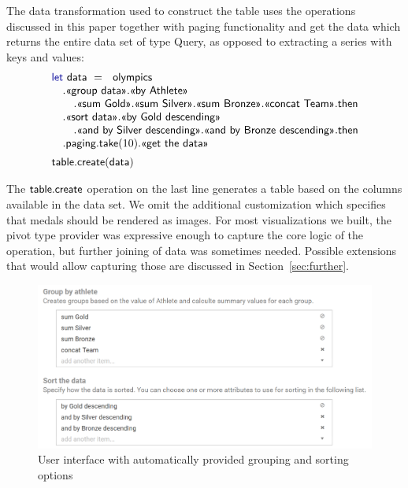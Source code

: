 \documentclass[a4paper,UKenglish]{lipics-v2016}
\theoremstyle{plain}
\theoremstyle{definition}
\newcommand{\kvd}[1]{\textnormal{\textcolor{kvdclr}{\sffamily #1}}}
\newcommand{\ident}[1]{\textnormal{\sffamily #1}}
\newcommand{\qident}[1]{\textnormal{\sffamily \guillemotleft #1\guillemotright}}
\begin{document}
The data transformation used to construct the table uses the operations discussed in this paper
together with paging functionality and \qident{get the data} which returns the entire data set
of type \ident{Query}, as opposed to extracting a series with keys and values:
%
\begin{equation*}
\begin{array}{l}
\kvd{let}~\ident{data}~=~\ident{olympics}\\
\quad .\qident{group data}.\qident{by Athlete}\\
\qquad .\qident{sum Gold}.\qident{sum Silver}.\qident{sum Bronze}.\qident{concat Team}.\ident{then}\\
\quad .\qident{sort data}.\qident{by Gold descending}\\
\qquad .\qident{and by Silver descending}.\qident{and by Bronze descending}.\ident{then}\\
\quad .\ident{paging}.\ident{take}(10).\qident{get the data}\\[0.5em]
\ident{table.create}(\ident{data})
\end{array}
\end{equation*}

\noindent
The $\ident{table.create}$ operation on the last line generates a table based on the columns 
available in the data set. We omit the additional customization which specifies that medals should
be rendered as images. For most visualizations we built, the pivot type provider was expressive
enough to capture the core logic of the operation, but further joining of data was sometimes
needed. Possible extensions that would allow capturing those are discussed in 
Section~\ref{sec:further}.


\begin{figure}[t]
\begin{center}
\includegraphics[scale=0.32,trim=0mm 0mm 0mm 0mm,clip]{images/options.png} %
\end{center}
\caption{User interface with automatically provided grouping and sorting options}
\label{fig:case-opts}
\end{figure}
\end{document}

